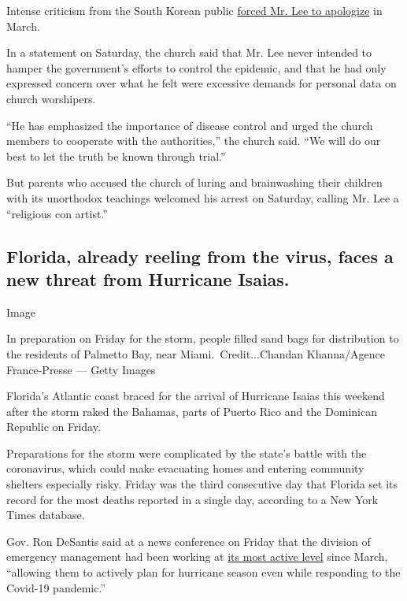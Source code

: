 Intense criticism from the South Korean public
\href{https://www.nytimes.com/2020/03/02/world/asia/coronavirus-south-korea-shincheonji.html}{forced
Mr. Lee to apologize} in March.

In a statement on Saturday, the church said that Mr. Lee never intended
to hamper the government's efforts to control the epidemic, and that he
had only expressed concern over what he felt were excessive demands for
personal data on church worshipers.

``He has emphasized the importance of disease control and urged the
church members to cooperate with the authorities,'' the church said.
``We will do our best to let the truth be known through trial.''

But parents who accused the church of luring and brainwashing their
children with its unorthodox teachings welcomed his arrest on Saturday,
calling Mr. Lee a ``religious con artist.''

\hypertarget{florida-already-reeling-from-the-virus-faces-a-new-threat-from-hurricane-isaias}{%
\subsection{Florida, already reeling from the virus, faces a new threat
from Hurricane
Isaias.}\label{florida-already-reeling-from-the-virus-faces-a-new-threat-from-hurricane-isaias}}

Image

In preparation on Friday for the storm, people filled sand bags for
distribution to the residents of Palmetto Bay, near
Miami.~Credit...Chandan Khanna/Agence France-Presse --- Getty Images

Florida's Atlantic coast braced for the arrival of Hurricane Isaias this
weekend after the storm raked the Bahamas, parts of Puerto Rico and the
Dominican Republic on Friday.

Preparations for the storm were complicated by the state's battle with
the coronavirus, which could make evacuating homes and entering
community shelters especially risky. Friday was the third consecutive
day that Florida set its record for the most deaths reported in a single
day, according to a New York Times database.

Gov. Ron DeSantis said at a news conference on Friday that the division
of emergency management had been working at
\href{https://www.floridadisaster.org/sert/eoc-activation-levels/}{its
most active level} since March, ``allowing them to actively plan for
hurricane season even while responding to the Covid-19 pandemic.''

